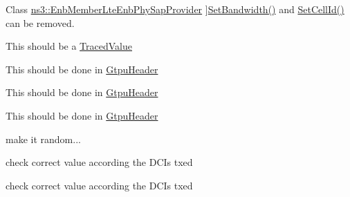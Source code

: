 \begin{DoxyRefList}
\hypertarget{todo__todo000084}{}%
Class \hyperlink{classns3_1_1EnbMemberLteEnbPhySapProvider}{ns3\+:\+:Enb\+Member\+Lte\+Enb\+Phy\+Sap\+Provider} ]\hyperlink{classns3_1_1EnbMemberLteEnbPhySapProvider_a8a391b3486c0a936f64cbd7b13454c8f}{Set\+Bandwidth()} and \hyperlink{classns3_1_1EnbMemberLteEnbPhySapProvider_aaca00aecc61ee56324e3365f98271ce0}{Set\+Cell\+Id()} can be removed.  
\item[\label{todo__todo000074}%
\hypertarget{todo__todo000074}{}%
Member \hyperlink{classns3_1_1EpcUeNas_a4a1b413f7ae25d1f74295fa2a76d55d3}{ns3\+:\+:Epc\+Ue\+Nas\+:\+:m\+\_\+state\+Transition\+Callback} ]This should be a \hyperlink{classns3_1_1TracedValue}{Traced\+Value}  
\item[\label{todo__todo000077}%
\hypertarget{todo__todo000077}{}%
Member \hyperlink{classns3_1_1EpcX2_a48c9322fd4cfc56fbcfb78c98ee1b7f6}{ns3\+:\+:Epc\+X2\+:\+:Do\+Receive\+Mc\+Pdcp\+Sdu} (Epc\+X2\+Sap\+Provider\+::\+Ue\+Data\+Params params)]This should be done in \hyperlink{classns3_1_1GtpuHeader}{Gtpu\+Header}  
\item[\label{todo__todo000076}%
\hypertarget{todo__todo000076}{}%
Member \hyperlink{classns3_1_1EpcX2_a641588d125f600122d56e34fa1fddd5c}{ns3\+:\+:Epc\+X2\+:\+:Do\+Send\+Mc\+Pdcp\+Pdu} (Epc\+X2\+Sap\+Provider\+::\+Ue\+Data\+Params params)]This should be done in \hyperlink{classns3_1_1GtpuHeader}{Gtpu\+Header}  
\item[\label{todo__todo000075}%
\hypertarget{todo__todo000075}{}%
Member \hyperlink{classns3_1_1EpcX2_a8a20256ed59b6f7f03095c3386ecc6d1}{ns3\+:\+:Epc\+X2\+:\+:Do\+Send\+Ue\+Data} (Epc\+X2\+Sap\+Provider\+::\+Ue\+Data\+Params params)]This should be done in \hyperlink{classns3_1_1GtpuHeader}{Gtpu\+Header}  
\item[\label{todo__todo000057}%
\hypertarget{todo__todo000057}{}%
Member \hyperlink{namespacens3_a1a6b8401da47f969f052f57371529beb}{ns3\+:\+:external\+\_\+rand} ()]make it random... 
\item[\label{todo__todo000078}%
\hypertarget{todo__todo000078}{}%
Member \hyperlink{classns3_1_1FdBetFfMacScheduler_a4e1f422a62da413de04f83ecb9abefc0}{ns3\+:\+:Fd\+Bet\+Ff\+Mac\+Scheduler\+:\+:Do\+Sched\+Dl\+Trigger\+Req} (const struct \hyperlink{structns3_1_1FfMacSchedSapProvider_1_1SchedDlTriggerReqParameters}{Ff\+Mac\+Sched\+Sap\+Provider\+::\+Sched\+Dl\+Trigger\+Req\+Parameters} \&params)]check correct value according the D\+C\+Is txed  
\item[\label{todo__todo000079}%
\hypertarget{todo__todo000079}{}%
Member \hyperlink{classns3_1_1FdMtFfMacScheduler_a27c2fe6ead967def6b90c069347532c7}{ns3\+:\+:Fd\+Mt\+Ff\+Mac\+Scheduler\+:\+:Do\+Sched\+Dl\+Trigger\+Req} (const struct \hyperlink{structns3_1_1FfMacSchedSapProvider_1_1SchedDlTriggerReqParameters}{Ff\+Mac\+Sched\+Sap\+Provider\+::\+Sched\+Dl\+Trigger\+Req\+Parameters} \&params)]check correct value according the D\+C\+Is txed  

\end{DoxyRefList}
